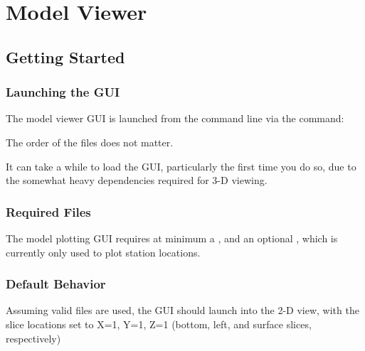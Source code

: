 \documentclass[letterpaper,10pt,english]{sphinxmanual}
\begin{document}
\section{Model Viewer}
\label{\detokenize{index:model-viewer}}

\subsection{Getting Started}
\label{\detokenize{content/model_viewer/getting_started:getting-started}}\label{\detokenize{content/model_viewer/getting_started::doc}}

\subsubsection{Launching the GUI}
\label{\detokenize{content/model_viewer/getting_started:launching-the-gui}}
The model viewer GUI is launched from the command line via the command:

\begin{sphinxVerbatim}[commandchars=\\\{\}]
  
\end{sphinxVerbatim}

The order of the files does not matter.

It can take a while to load the GUI, particularly the first time you do so, due to the somewhat heavy dependencies required for 3-D viewing.


\subsubsection{Required Files}
\label{\detokenize{content/model_viewer/getting_started:required-files}}
The model plotting GUI requires at minimum a {\hyperref[\detokenize{content/api_core/input_files:model-file}]{}}, and an optional {\hyperref[\detokenize{content/api_core/input_files:data-file}]{}}, which is currently only used to plot station locations.


\subsubsection{Default Behavior}
\label{\detokenize{content/model_viewer/getting_started:default-behavior}}
Assuming valid files are used, the GUI should launch into the 2-D view, with the slice locations set to X=1, Y=1, Z=1 (bottom, left, and surface slices, respectively)
\end{document}
